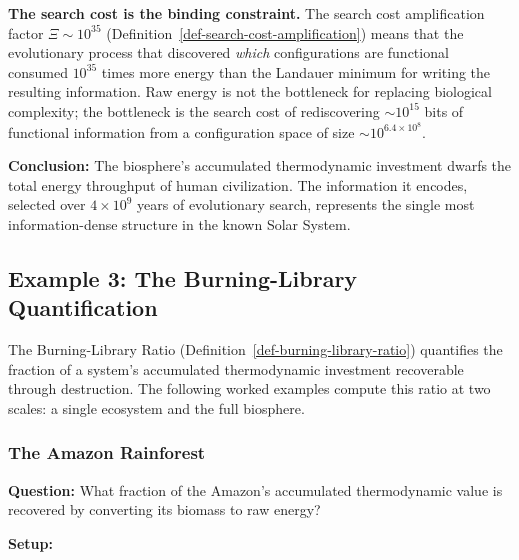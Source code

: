 \documentclass[11pt]{article}
\theoremstyle{plain}
\theoremstyle{definition}
\theoremstyle{remark}
\let\origsubsection\subsection
\renewcommand{\subsection}{\needspace{7\baselineskip}\origsubsection}
\let\origsubsubsection\subsubsection
\renewcommand{\subsubsection}{\needspace{4\baselineskip}\origsubsubsection}
\begin{document}
\textbf{The search cost is the binding constraint.} The search cost
amplification factor \(\Xi \sim 10^{35}\)
(Definition~\ref{def-search-cost-amplification}) means that the
evolutionary process that discovered \emph{which} configurations are
functional consumed \(10^{35}\) times more energy than the Landauer
minimum for writing the resulting information. Raw energy is not the
bottleneck for replacing biological complexity; the bottleneck is the
search cost of rediscovering \(\sim 10^{15}\) bits of functional
information from a configuration space of size
\(\sim 10^{6.4 \times 10^8}\).

\textbf{Conclusion:} The biosphere's accumulated thermodynamic
investment dwarfs the total energy throughput of human civilization. The
information it encodes, selected over \(4 \times 10^9\) years of
evolutionary search, represents the single most information-dense
structure in the known Solar System.

\subsection{Example 3: The Burning-Library
Quantification}\label{example-3-the-burning-library-quantification}

The Burning-Library Ratio (Definition~\ref{def-burning-library-ratio})
quantifies the fraction of a system's accumulated thermodynamic
investment recoverable through destruction. The following worked
examples compute this ratio at two scales: a single ecosystem and the
full biosphere.

\subsubsection{The Amazon Rainforest}\label{the-amazon-rainforest}

\textbf{Question:} What fraction of the Amazon's accumulated
thermodynamic value is recovered by converting its biomass to raw
energy?

\textbf{Setup:}
\end{document}
